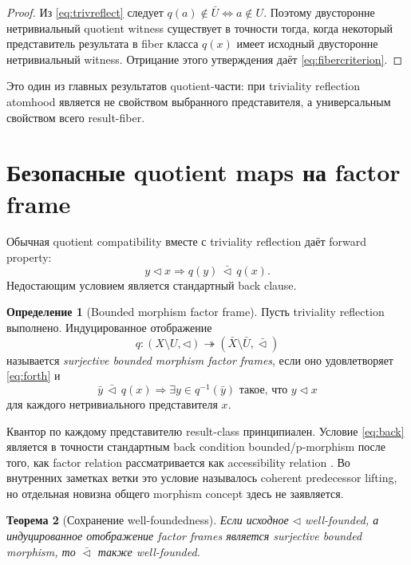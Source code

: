 \documentclass[11pt]{article}
\newtheorem{theorem}{Теорема}[section]
\theoremstyle{definition}
\newtheorem{definition}[theorem]{Определение}
\theoremstyle{remark}
\begin{document}
\begin{proof}
Из \eqref{eq:trivreflect} следует \(q(a)\notin\bar U\iff a\notin U\). Поэтому двусторонне нетривиальный quotient witness существует в точности тогда, когда некоторый представитель результата в fiber класса \(q(x)\) имеет исходный двусторонне нетривиальный witness. Отрицание этого утверждения даёт \eqref{eq:fibercriterion}.
\end{proof}

Это один из главных результатов quotient-части: при triviality reflection atomhood является не свойством выбранного представителя, а универсальным свойством всего result-fiber.

\section{Безопасные quotient maps на factor frame}

Обычная quotient compatibility вместе с triviality reflection даёт forward property:
\begin{equation}
y\triangleleft x\Longrightarrow q(y)\,\bar\triangleleft\,q(x).
\label{eq:forth}
\end{equation}
Недостающим условием является стандартный back clause.

\begin{definition}[Bounded morphism factor frame]
Пусть triviality reflection выполнено. Индуцированное отображение
\[
q:(X\setminus U,\triangleleft)\twoheadrightarrow
(\bar X\setminus\bar U,\bar\triangleleft)
\]
называется \emph{surjective bounded morphism factor frames}, если оно удовлетворяет \eqref{eq:forth} и
\begin{equation}
\boxed{
\bar y\,\bar\triangleleft\,q(x)
\Longrightarrow
\exists y\in q^{-1}(\bar y)\text{ такое, что }y\triangleleft x
}
\label{eq:back}
\end{equation}
для каждого нетривиального представителя \(x\).
\end{definition}

Квантор по каждому представителю result-class принципиален. Условие \eqref{eq:back} является в точности стандартным back condition bounded/p-morphism после того, как factor relation рассматривается как accessibility relation \cite{BlackburnDeRijkeVenema2001}. Во внутренних заметках ветки это условие называлось coherent predecessor lifting, но отдельная новизна общего morphism concept здесь не заявляется.

\begin{theorem}[Сохранение well-foundedness]
Если исходное \(\triangleleft\) well-founded, а индуцированное отображение factor frames является surjective bounded morphism, то \(\bar\triangleleft\) также well-founded.
\end{theorem}
\end{document}
